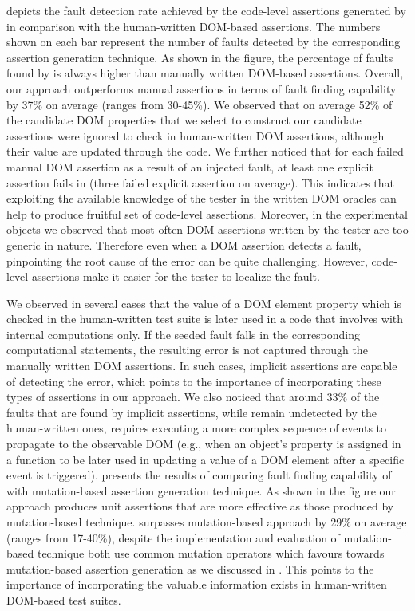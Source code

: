  depicts the fault detection rate achieved by the code-level assertions generated by \tool in comparison with the human-written DOM-based assertions. The numbers shown on each bar represent the number of faults detected by the corresponding assertion generation technique. As shown in the figure, the percentage of faults found by \tool is always higher than manually written DOM-based assertions. Overall, our approach outperforms manual assertions in terms of fault finding capability by 37\% on average (ranges from 30-45\%). We observed that on average 52\% of the candidate DOM properties that we select to construct our candidate assertions were ignored to check in human-written DOM assertions, although their value are updated through the \javascript code.
We further noticed that for each failed manual DOM assertion as a result of an injected fault, at least one explicit assertion fails in \tool (three failed explicit assertion on average). This indicates that exploiting the available knowledge of the tester in the written DOM oracles can help to produce fruitful set of code-level assertions. Moreover, in the experimental objects we observed that most often DOM assertions written by the tester are too generic in nature. Therefore even when a DOM assertion detects a \javascript fault, pinpointing the root cause of the error can be quite challenging. However, code-level assertions make it easier for the tester to localize the fault.

We observed in several cases that the value of a DOM element property which is checked in the human-written test suite is later used in a \javascript code that involves with internal computations only. If the seeded fault falls in the corresponding computational statements, the resulting error is not captured through the manually written DOM assertions. In such cases, implicit assertions are capable of detecting the error, which points to the importance of incorporating these types of assertions in our approach. We also noticed that around 33\% of the faults that are found by implicit assertions, while remain undetected by the human-written ones, requires executing a more complex sequence of events to propagate to the observable DOM (e.g., when an object's property is assigned in a function to be later used in updating a value of a DOM element after a specific event is triggered).    
 presents the results of comparing fault finding capability of \tool with mutation-based assertion generation technique. As shown in the figure our approach produces unit assertions that are more effective as those produced by mutation-based technique. \tool surpasses mutation-based approach by 29\% on average (ranges from 17-40\%), despite the implementation and evaluation of mutation-based technique both use common mutation operators which favours towards mutation-based assertion generation as we discussed in . This points to the importance of incorporating the valuable information exists in human-written DOM-based test suites.

